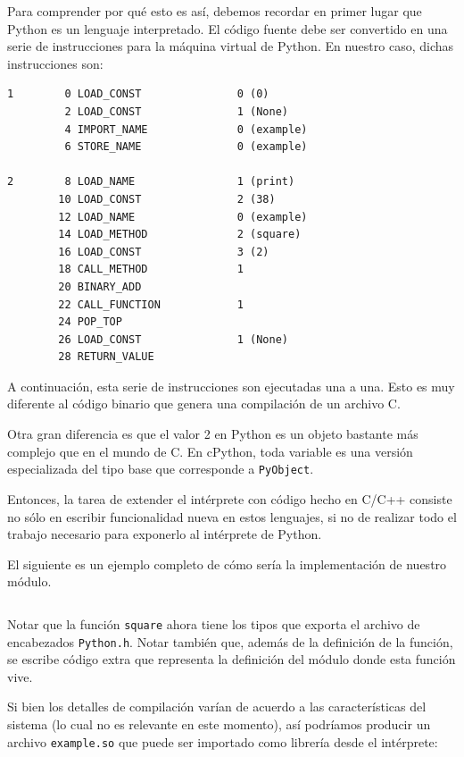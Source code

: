\documentclass[]{article}
\begin{document}
Para comprender por qué esto es así, debemos recordar en primer lugar que
Python es un lenguaje interpretado. El código fuente debe ser convertido en una
serie de instrucciones para la máquina virtual de Python. En nuestro caso,
dichas instrucciones son:

\begin{verbatim}
1        0 LOAD_CONST               0 (0)
         2 LOAD_CONST               1 (None)
         4 IMPORT_NAME              0 (example)
         6 STORE_NAME               0 (example)

2        8 LOAD_NAME                1 (print)
        10 LOAD_CONST               2 (38)
        12 LOAD_NAME                0 (example)
        14 LOAD_METHOD              2 (square)
        16 LOAD_CONST               3 (2)
        18 CALL_METHOD              1
        20 BINARY_ADD
        22 CALL_FUNCTION            1
        24 POP_TOP
        26 LOAD_CONST               1 (None)
        28 RETURN_VALUE
\end{verbatim}

A continuación, esta serie de instrucciones son ejecutadas una a una. Esto es
muy diferente al código binario que genera una compilación de un archivo C.

Otra gran diferencia es que el valor 2 en Python es un objeto bastante más
complejo que en el mundo de C. En cPython, toda variable es una versión
especializada del tipo base que corresponde a \verb!PyObject!.

Entonces, la tarea de extender el intérprete con código hecho en C/C++ consiste
no sólo en escribir funcionalidad nueva en estos lenguajes, si no de realizar
todo el trabajo necesario para exponerlo al intérprete de Python.

El siguiente es un ejemplo completo de cómo sería la implementación de nuestro módulo. 

\inputminted{c}{codelistings/module.c}

Notar que la función \verb!square! ahora tiene los tipos que exporta el archivo
de encabezados \verb!Python.h!. Notar también que, además de la definición de
la función, se escribe código extra que representa la definición del módulo
donde esta función vive.

Si bien los detalles de compilación varían de acuerdo a las características del
sistema (lo cual no es relevante en este momento), así podríamos producir un
archivo \verb!example.so! que puede ser importado como librería desde el
intérprete:
\end{document}
